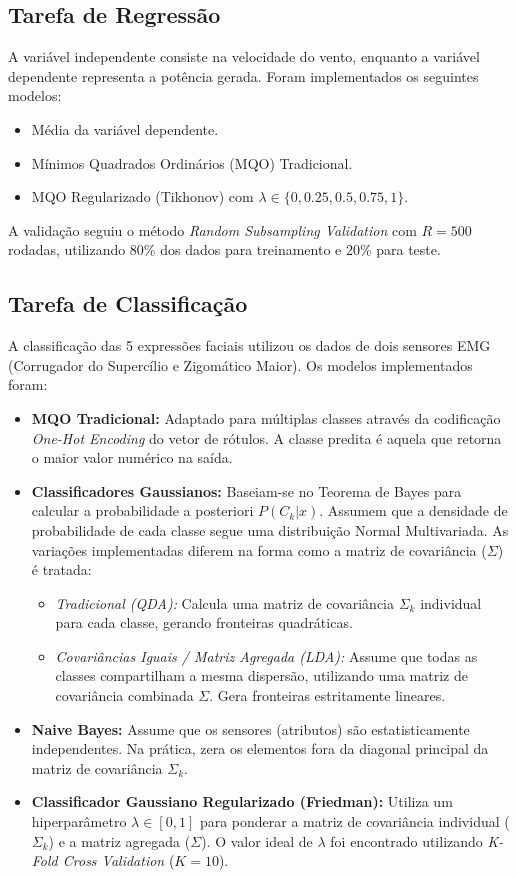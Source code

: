 \documentclass[journal,onecolumn]{IEEEtran}
\begin{document}
\subsection{Tarefa de Regressão}
A variável independente consiste na velocidade do vento, enquanto a variável dependente representa a potência gerada. Foram implementados os seguintes modelos:
\begin{itemize}
    \item Média da variável dependente.
    \item Mínimos Quadrados Ordinários (MQO) Tradicional.
    \item MQO Regularizado (Tikhonov) com $\lambda \in \{0, 0.25, 0.5, 0.75, 1\}$.
\end{itemize}
A validação seguiu o método \textit{Random Subsampling Validation} com $R=500$ rodadas, utilizando 80\% dos dados para treinamento e 20\% para teste.

\subsection{Tarefa de Classificação}
A classificação das 5 expressões faciais utilizou os dados de dois sensores EMG (Corrugador do Supercílio e Zigomático Maior). Os modelos implementados foram:
\begin{itemize}
    \item \textbf{MQO Tradicional:} Adaptado para múltiplas classes através da codificação \textit{One-Hot Encoding} do vetor de rótulos. A classe predita é aquela que retorna o maior valor numérico na saída.
    \item \textbf{Classificadores Gaussianos:} Baseiam-se no Teorema de Bayes para calcular a probabilidade a posteriori $P(C_k|x)$. Assumem que a densidade de probabilidade de cada classe segue uma distribuição Normal Multivariada. As variações implementadas diferem na forma como a matriz de covariância ($\Sigma$) é tratada:
    \begin{itemize}
        \item \textit{Tradicional (QDA):} Calcula uma matriz de covariância $\Sigma_k$ individual para cada classe, gerando fronteiras quadráticas.
        \item \textit{Covariâncias Iguais / Matriz Agregada (LDA):} Assume que todas as classes compartilham a mesma dispersão, utilizando uma matriz de covariância combinada $\Sigma$. Gera fronteiras estritamente lineares.
    \end{itemize}
    \item \textbf{Naive Bayes:} Assume que os sensores (atributos) são estatisticamente independentes. Na prática, zera os elementos fora da diagonal principal da matriz de covariância $\Sigma_k$.
    \item \textbf{Classificador Gaussiano Regularizado (Friedman):} Utiliza um hiperparâmetro $\lambda \in [0, 1]$ para ponderar a matriz de covariância individual ($\Sigma_k$) e a matriz agregada ($\Sigma$). O valor ideal de $\lambda$ foi encontrado utilizando \textit{K-Fold Cross Validation} ($K=10$).
\end{itemize}
\end{document}
